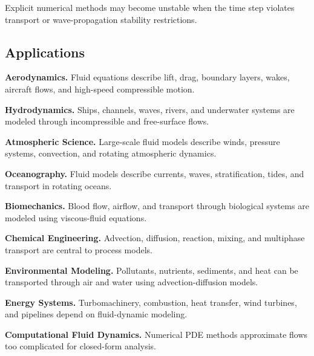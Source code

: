 Explicit numerical methods may become unstable when the time step violates
transport or wave-propagation stability restrictions.

\subsection{Applications}
\label{subsec:fluid-dynamics-applications}

\begin{applicationbox}

\textbf{Aerodynamics.}
Fluid equations describe lift, drag, boundary layers, wakes, aircraft flows,
and high-speed compressible motion.

\medskip

\textbf{Hydrodynamics.}
Ships, channels, waves, rivers, and underwater systems are modeled through
incompressible and free-surface flows.

\medskip

\textbf{Atmospheric Science.}
Large-scale fluid models describe winds, pressure systems, convection, and
rotating atmospheric dynamics.

\medskip

\textbf{Oceanography.}
Fluid models describe currents, waves, stratification, tides, and transport
in rotating oceans.

\medskip

\textbf{Biomechanics.}
Blood flow, airflow, and transport through biological systems are modeled
using viscous-fluid equations.

\medskip

\textbf{Chemical Engineering.}
Advection, diffusion, reaction, mixing, and multiphase transport are central
to process models.

\medskip

\textbf{Environmental Modeling.}
Pollutants, nutrients, sediments, and heat can be transported through air and
water using advection-diffusion models.

\medskip

\textbf{Energy Systems.}
Turbomachinery, combustion, heat transfer, wind turbines, and pipelines
depend on fluid-dynamic modeling.

\medskip

\textbf{Computational Fluid Dynamics.}
Numerical PDE methods approximate flows too complicated for closed-form
analysis.

\end{applicationbox}

